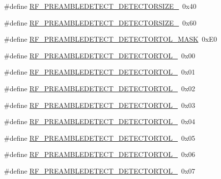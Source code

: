 \begin{DoxyCompactItemize}
\item 
\#define \mbox{\hyperlink{sx1276_regs-_fsk_8h_a24df8f8f9be8c45c5d5b5ecc8481c4b6}{R\+F\+\_\+\+P\+R\+E\+A\+M\+B\+L\+E\+D\+E\+T\+E\+C\+T\+\_\+\+D\+E\+T\+E\+C\+T\+O\+R\+S\+I\+Z\+E\+\_}}~0x40
\item 
\#define \mbox{\hyperlink{sx1276_regs-_fsk_8h_a068ff264e935f49fcf3dbc2cea7e0e8a}{R\+F\+\_\+\+P\+R\+E\+A\+M\+B\+L\+E\+D\+E\+T\+E\+C\+T\+\_\+\+D\+E\+T\+E\+C\+T\+O\+R\+S\+I\+Z\+E\+\_}}~0x60
\item 
\#define \mbox{\hyperlink{sx1276_regs-_fsk_8h_afe6902084d6b9beef5eafd33ef3e8909}{R\+F\+\_\+\+P\+R\+E\+A\+M\+B\+L\+E\+D\+E\+T\+E\+C\+T\+\_\+\+D\+E\+T\+E\+C\+T\+O\+R\+T\+O\+L\+\_\+\+M\+A\+SK}}~0x\+E0
\item 
\#define \mbox{\hyperlink{sx1276_regs-_fsk_8h_a47aab5851ef02c5294a3f963992435e4}{R\+F\+\_\+\+P\+R\+E\+A\+M\+B\+L\+E\+D\+E\+T\+E\+C\+T\+\_\+\+D\+E\+T\+E\+C\+T\+O\+R\+T\+O\+L\+\_}}~0x00
\item 
\#define \mbox{\hyperlink{sx1276_regs-_fsk_8h_ad2ff8de8b56560355096d8a801ce5680}{R\+F\+\_\+\+P\+R\+E\+A\+M\+B\+L\+E\+D\+E\+T\+E\+C\+T\+\_\+\+D\+E\+T\+E\+C\+T\+O\+R\+T\+O\+L\+\_}}~0x01
\item 
\#define \mbox{\hyperlink{sx1276_regs-_fsk_8h_a5ba9d732666a53326a6d250c03a3bb5e}{R\+F\+\_\+\+P\+R\+E\+A\+M\+B\+L\+E\+D\+E\+T\+E\+C\+T\+\_\+\+D\+E\+T\+E\+C\+T\+O\+R\+T\+O\+L\+\_}}~0x02
\item 
\#define \mbox{\hyperlink{sx1276_regs-_fsk_8h_ab1241db9216a97e01cdae2448254397f}{R\+F\+\_\+\+P\+R\+E\+A\+M\+B\+L\+E\+D\+E\+T\+E\+C\+T\+\_\+\+D\+E\+T\+E\+C\+T\+O\+R\+T\+O\+L\+\_}}~0x03
\item 
\#define \mbox{\hyperlink{sx1276_regs-_fsk_8h_a95a2297e4d989009a9aa9381be6421b3}{R\+F\+\_\+\+P\+R\+E\+A\+M\+B\+L\+E\+D\+E\+T\+E\+C\+T\+\_\+\+D\+E\+T\+E\+C\+T\+O\+R\+T\+O\+L\+\_}}~0x04
\item 
\#define \mbox{\hyperlink{sx1276_regs-_fsk_8h_af616497c0128bb6a90bcc753f8b7cd98}{R\+F\+\_\+\+P\+R\+E\+A\+M\+B\+L\+E\+D\+E\+T\+E\+C\+T\+\_\+\+D\+E\+T\+E\+C\+T\+O\+R\+T\+O\+L\+\_}}~0x05
\item 
\#define \mbox{\hyperlink{sx1276_regs-_fsk_8h_a6fb0dbd911e9ed04d2f243052a818e19}{R\+F\+\_\+\+P\+R\+E\+A\+M\+B\+L\+E\+D\+E\+T\+E\+C\+T\+\_\+\+D\+E\+T\+E\+C\+T\+O\+R\+T\+O\+L\+\_}}~0x06
\item 
\#define \mbox{\hyperlink{sx1276_regs-_fsk_8h_a8fa771bedf632878d3a377491c0a31da}{R\+F\+\_\+\+P\+R\+E\+A\+M\+B\+L\+E\+D\+E\+T\+E\+C\+T\+\_\+\+D\+E\+T\+E\+C\+T\+O\+R\+T\+O\+L\+\_}}~0x07
\item 

\end{DoxyCompactItemize}
